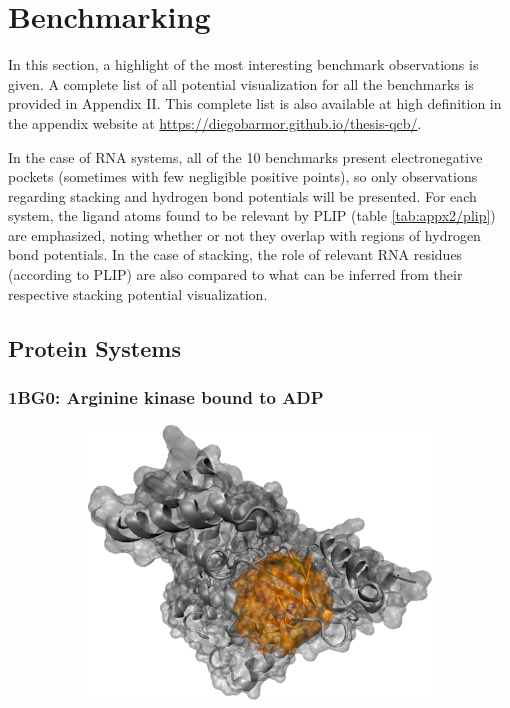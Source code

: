 \section{Benchmarking}
  In this section, a highlight of the most interesting benchmark observations is given. A complete list of all potential visualization for all the benchmarks is provided in Appendix II. This complete list is also available at high definition in the appendix website at \url{https://diegobarmor.github.io/thesis-qcb/}.

  In the case of RNA systems, all of the 10 benchmarks present electronegative pockets (sometimes with few negligible positive points), so only observations regarding stacking and hydrogen bond potentials will be presented. For each system, the ligand atoms found to be relevant by PLIP (table \ref{tab:appx2/plip}) are emphasized, noting whether or not they overlap with regions of hydrogen bond potentials. In the case of stacking, the role of relevant RNA residues (according to PLIP) are also compared to what can be inferred from their respective stacking potential visualization.

  \pagebreak
  \subsection{Protein Systems}
    \subsubsection{1BG0: Arginine kinase bound to ADP}
      \begin{figure}[H] \centering
        \begin{subfigure}[c]{0.3\textwidth} \centering
          \includegraphics[width=1\textwidth]{figures/results/ps_prot/1bg0.png}
        \end{subfigure}
        \begin{subfigure}[c]{0.3\textwidth} \centering
        \end{subfigure}
      \end{figure}


